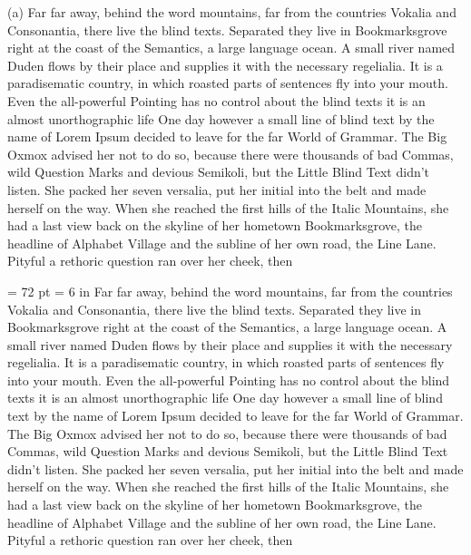 \item{(a)} Far far away, behind the word mountains, far from the countries Vokalia and Consonantia, 
there live the blind texts. Separated they live in Bookmarksgrove right at the coast of 
the Semantics, a large language ocean. A small river named Duden flows by their place and 
supplies it with the necessary regelialia. It is a paradisematic country, in which roasted 
parts of sentences fly into your mouth. Even the all-powerful Pointing has no control about 
the blind texts it is an almost unorthographic life One day however a small line of blind text 
by the name of Lorem Ipsum decided to leave for the far World of Grammar. The Big Oxmox advised 
her not to do so, because there were thousands of bad Commas, wild Question Marks and devious Semikoli,
 but the Little Blind Text didn’t listen. She packed her seven versalia, put her initial into the belt 
 and made herself on the way. When she reached the first hills of the Italic Mountains, she had a 
 last view back on the skyline of her hometown Bookmarksgrove, the headline of Alphabet Village and 
 the subline of her own road, the Line Lane. Pityful a rethoric question ran over her cheek, then 

\parindent = 72 pt
\hsize = 6 in
 Far far away, behind the word mountains, far from the countries Vokalia and Consonantia, 
there live the blind texts. Separated they live in Bookmarksgrove right at the coast of 
the Semantics, a large language ocean. A small river named Duden flows by their place and 
supplies it with the necessary regelialia. It is a paradisematic country, in which roasted 
parts of sentences fly into your mouth. Even the all-powerful Pointing has no control about 
the blind texts it is an almost unorthographic life One day however a small line of blind text 
by the name of Lorem Ipsum decided to leave for the far World of Grammar. The Big Oxmox advised 
her not to do so, because there were thousands of bad Commas, wild Question Marks and devious Semikoli,
 but the Little Blind Text didn’t listen. She packed her seven versalia, put her initial into the belt 
 and made herself on the way. When she reached the first hills of the Italic Mountains, she had a 
 last view back on the skyline of her hometown Bookmarksgrove, the headline of Alphabet Village and 
 the subline of her own road, the Line Lane. Pityful a rethoric question ran over her cheek, then 


